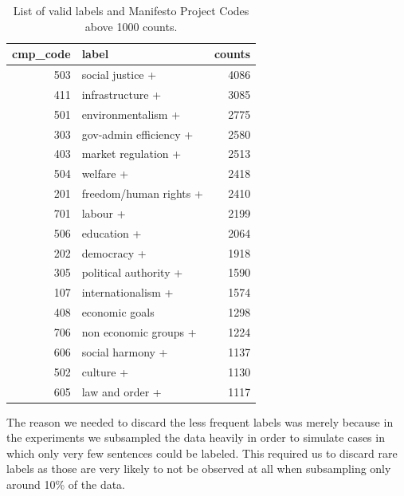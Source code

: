 \documentclass[runningheads,a4paper]{article}
\begin{document}
\begin{table}
\centering
\label{tab:valid_labels} 

\begin{tabular}{rlr}
\toprule
 cmp\_code &                   label &  counts \\
\midrule
      503 &        social justice + &    4086 \\
      411 &        infrastructure + &    3085 \\
      501 &      environmentalism + &    2775 \\
      303 &  gov-admin efficiency + &    2580 \\
      403 &     market regulation + &    2513 \\
      504 &               welfare + &    2418 \\
      201 &  freedom/human rights + &    2410 \\
      701 &                labour + &    2199 \\
      506 &             education + &    2064 \\
      202 &             democracy + &    1918 \\
      305 &   political authority + &    1590 \\
      107 &      internationalism + &    1574 \\
      408 &          economic goals &    1298 \\
      706 &   non economic groups + &    1224 \\
      606 &        social harmony + &    1137 \\
      502 &               culture + &    1130 \\
      605 &         law and order + &    1117 \\
\bottomrule
\end{tabular}
\caption{List of valid labels and Manifesto Project Codes above 1000 counts.}
\end{table}

The reason we needed to discard the less frequent labels was merely because in the experiments we subsampled the data heavily in order to simulate cases in which only very few sentences could be labeled. This required us to discard rare labels as those are very likely to not be observed at all when subsampling only around 10\% of the data. 
\end{document}
